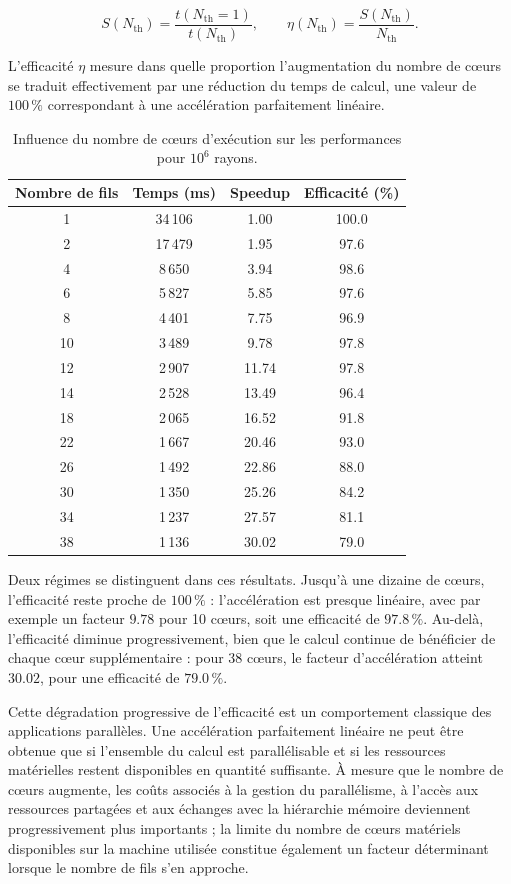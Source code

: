 \begin{equation}
S(N_{\mathrm{th}}) = \frac{t(N_{\mathrm{th}}=1)}{t(N_{\mathrm{th}})},
\qquad
\eta(N_{\mathrm{th}}) = \frac{S(N_{\mathrm{th}})}{N_{\mathrm{th}}}.
\end{equation}

L'efficacité $\eta$ mesure dans quelle proportion l'augmentation du nombre de c\oe urs se traduit effectivement par une réduction du temps de calcul, une valeur de $100\,\%$ correspondant à une accélération parfaitement linéaire.

\begin{table}[H]
\centering
\caption{Influence du nombre de c\oe urs d'exécution sur les performances pour $10^6$ rayons.}
\label{tab:thread_perf}
\begin{tabular}{cccc}
\toprule
Nombre de fils & Temps (ms) & Speedup & Efficacité (\%) \\
\midrule
1  & 34\,106 & 1.00  & 100.0 \\
2  & 17\,479 & 1.95  & 97.6 \\
4  & 8\,650  & 3.94  & 98.6 \\
6  & 5\,827  & 5.85  & 97.6 \\
8  & 4\,401  & 7.75  & 96.9 \\
10 & 3\,489  & 9.78  & 97.8 \\
12 & 2\,907  & 11.74 & 97.8 \\
14 & 2\,528  & 13.49 & 96.4 \\
18 & 2\,065  & 16.52 & 91.8 \\
22 & 1\,667  & 20.46 & 93.0 \\
26 & 1\,492  & 22.86 & 88.0 \\
30 & 1\,350  & 25.26 & 84.2 \\
34 & 1\,237  & 27.57 & 81.1 \\
38 & 1\,136  & 30.02 & 79.0 \\
\bottomrule
\end{tabular}
\end{table}

Deux régimes se distinguent dans ces résultats. Jusqu'à une dizaine de c\oe urs, l'efficacité reste proche de $100\,\%$ : l'accélération est presque linéaire, avec par exemple un facteur $9.78$ pour 10 c\oe urs, soit une efficacité de $97.8\,\%$. Au-delà, l'efficacité diminue progressivement, bien que le calcul continue de bénéficier de chaque c\oe ur supplémentaire : pour 38 c\oe urs, le facteur d'accélération atteint $30.02$, pour une efficacité de $79.0\,\%$.

Cette dégradation progressive de l'efficacité est un comportement classique des applications parallèles. Une accélération parfaitement linéaire ne peut être obtenue que si l'ensemble du calcul est parallélisable et si les ressources matérielles restent disponibles en quantité suffisante. À mesure que le nombre de c\oe urs augmente, les coûts associés à la gestion du parallélisme, à l'accès aux ressources partagées et aux échanges avec la hiérarchie mémoire deviennent progressivement plus importants ; la limite du nombre de c\oe urs matériels disponibles sur la machine utilisée constitue également un facteur déterminant lorsque le nombre de fils s'en approche.

